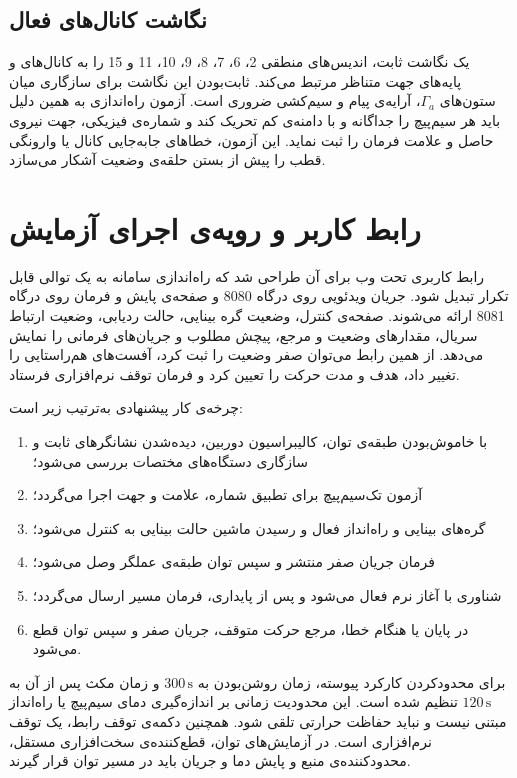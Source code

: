 \subsection{نگاشت کانال‌های فعال}

یک نگاشت ثابت، اندیس‌های منطقی 2، 6، 7، 8، 9، 10، 11 و 15 را به کانال‌های  و پایه‌های جهت متناظر مرتبط می‌کند. ثابت‌بودن این نگاشت برای سازگاری میان ستون‌های $\Gamma_a$، آرایه‌ی پیام و سیم‌کشی ضروری است. آزمون راه‌اندازی به همین دلیل باید هر سیم‌پیچ را جداگانه و با دامنه‌ی کم تحریک کند و شماره‌ی فیزیکی، جهت نیروی حاصل و علامت فرمان را ثبت نماید. این آزمون، خطاهای جابه‌جایی کانال یا وارونگی قطب را پیش از بستن حلقه‌ی وضعیت آشکار می‌سازد.

\section{رابط کاربر و رویه‌ی اجرای آزمایش}
\label{sec:method-hmi-workflow}

رابط کاربری تحت وب برای آن طراحی شد که راه‌اندازی سامانه به یک توالی قابل تکرار تبدیل شود. جریان ویدئویی روی درگاه 8080 و صفحه‌ی پایش و فرمان روی درگاه 8081 ارائه می‌شوند. صفحه‌ی کنترل، وضعیت گره بینایی، حالت ردیابی، وضعیت ارتباط سریال، مقدارهای وضعیت و مرجع، پیچش مطلوب و جریان‌های فرمانی را نمایش می‌دهد. از همین رابط می‌توان صفر وضعیت را ثبت کرد، آفست‌های هم‌راستایی را تغییر داد، هدف و مدت حرکت را تعیین کرد و فرمان توقف نرم‌افزاری فرستاد.

چرخه‌ی کار پیشنهادی به‌ترتیب زیر است:

\begin{enumerate}
	\item با خاموش‌بودن طبقه‌ی توان، کالیبراسیون دوربین، دیده‌شدن نشانگرهای ثابت و سازگاری دستگاه‌های مختصات بررسی می‌شود؛
	\item آزمون تک‌سیم‌پیچ برای تطبیق شماره، علامت و جهت اجرا می‌گردد؛
	\item گره‌های بینایی و راه‌انداز فعال و رسیدن ماشین حالت بینایی به  کنترل می‌شود؛
	\item فرمان جریان صفر منتشر و سپس توان طبقه‌ی عملگر وصل می‌شود؛
	\item شناوری با آغاز نرم فعال می‌شود و پس از پایداری، فرمان مسیر ارسال می‌گردد؛
	\item در پایان یا هنگام خطا، مرجع حرکت متوقف، جریان صفر و سپس توان قطع می‌شود.
\end{enumerate}

برای محدودکردن کارکرد پیوسته، زمان روشن‌بودن به $300\,\mathrm s$ و زمان مکث پس از آن به $120\,\mathrm s$ تنظیم شده است. این محدودیت زمانی بر اندازه‌گیری دمای سیم‌پیچ یا راه‌انداز مبتنی نیست و نباید حفاظت حرارتی تلقی شود. همچنین دکمه‌ی توقف رابط، یک توقف نرم‌افزاری است. در آزمایش‌های توان، قطع‌کننده‌ی سخت‌افزاری مستقل، محدودکننده‌ی منبع و پایش دما و جریان باید در مسیر توان قرار گیرند.

